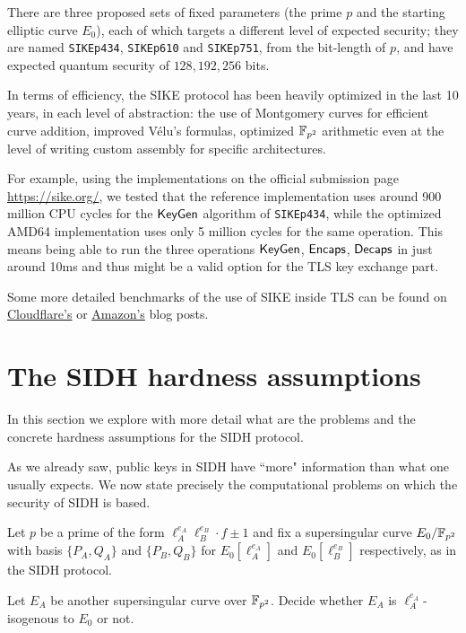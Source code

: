 There are three proposed sets of fixed parameters (the prime $p$ and the starting elliptic curve $E_0$), each of which targets a different level of expected security; they are named \texttt{SIKEp434}, \texttt{SIKEp610} and \texttt{SIKEp751}, from the bit-length of $p$, and have expected quantum security of $128, 192, 256$ bits.

In terms of efficiency, the SIKE protocol has been heavily optimized in the last 10 years, in each level of abstraction: the use of Montgomery curves for efficient curve addition, improved Vélu's formulas, optimized $\mathbb{F}_{p^2}$ arithmetic even at the level of writing custom assembly for specific architectures.

For example, using the implementations on the official submission page \url{https://sike.org/},
we tested that the reference implementation uses around 900 million CPU cycles for the $\mathsf{KeyGen}$ algorithm of \texttt{SIKEp434}, while the optimized AMD64 implementation uses only 5 million cycles for the same operation. This means being able to run the three operations $\mathsf{KeyGen}$, $\mathsf{Encaps}$, $\mathsf{Decaps}$ in just around 10ms and thus might be a valid option for the TLS key exchange part.

Some more detailed benchmarks of the use of SIKE inside TLS can be found on \href{https://blog.cloudflare.com/the-tls-post-quantum-experiment/}{Cloudflare's} or \href{https://aws.amazon.com/it/blogs/security/round-2-hybrid-post-quantum-tls-benchmarks/}{Amazon's} blog posts.

\section{The SIDH hardness assumptions}
In this section we explore with more detail what are the problems and the concrete hardness assumptions for the SIDH protocol.

As we already saw, public keys in SIDH have ``more" information than what one usually expects. We now state precisely the computational problems on which the security of SIDH is based.

Let $p$ be a prime of the form $\ell_A^{e_A}\ell_B^{e_B}\cdot f\pm1$ and fix a supersingular curve $E_0/\mathbb{F}_{p^2}$ with basis $\{P_A,Q_A\}$ and $\{P_B,Q_B\}$ for $E_0[\ell_A^{e_A}]$ and $E_0[\ell_B^{e_B}]$ respectively, as in the SIDH protocol.

\begin{problem}
    Let $E_A$ be another supersingular curve over $\mathbb{F}_{p^2}$. Decide whether $E_A$ is $\ell_A^{e_A}$-isogenous to $E_0$ or not.
\end{problem}

